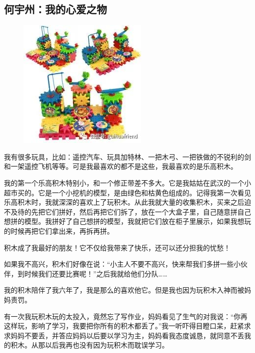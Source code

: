 \vspace{10pt}

{\centering\subsection*{何宇州：我的心爱之物}}


\renewcommand{\leftmark}{何宇州：我的心爱之物}

\begin{figure}[htbp]

\centering

\includegraphics[width = .5\textwidth]{./ch/12.jpg}

\end{figure}



我有很多玩具，比如：遥控汽车、玩具加特林、一把木弓、一把铁做的不锐利的剑和一架遥控飞机等等。可是我最喜欢的都不是这些，我最喜欢的是乐高积木。

我的第一个乐高积木特别小，和一个修正带差不多大。它是我姑姑在武汉的一个小超市买的。它是一个小挖机的模型，是由绿色和枯黄色组成的。记得我第一次看见乐高积木时，我就深深的喜欢上了玩积木。从此我就大量的收集积木，买来之后迫不及待的先把它们拼好，然后再把它们拆了，放在一个大盒子里，自己随意拼自己想拼的模型。我拼好了自己想拼的模型，我就把它们放在柜子里展示，如果我想玩的时候再把它们拿出来，再拆再拼。

积木成了我最好的朋友！它不仅给我带来了快乐，还可以还分担我的忧愁！

如果我不高兴，积木们好像在说：“小主人不要不高兴，快来帮我们多拼一些小伙伴，到时候我们还要比赛呢！”之后我就给他们分队……

我的积木陪伴了我六年了，我是那么的喜欢他它。但是我也因为玩积木入神而被妈妈责罚。

有一次我玩积木玩的太投入，竟然忘了写作业，妈妈看见了生气的对我说：“你再这样玩，影响了学习，我要把你所有的积木都丢了。”我一听吓得目瞪口呆，赶紧求求妈妈不要丢，并答应妈妈以后要以学习为主，妈妈看我态度诚恳，就同意不丢我的积木。从那以后我再也没有因为玩积木而耽误学习。

